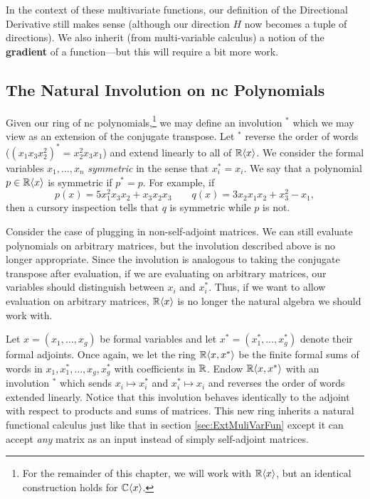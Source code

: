 In the context of these multivariate functions, our definition of the
Directional Derivative still makes sense (although our direction \(H\) now
becomes a tuple of directions). We also inherit (from multi-variable calculus) a
notion of the \textbf{gradient} of a function---but this will require a bit more work.

\subsection{The Natural Involution on nc Polynomials}%
\label{ssec:NatInvo}

Given our ring of nc polynomials,\footnote{For the remainder of this chapter,
  we will work with \(\mathbb{R} \langle x \rangle \), but an identical construction
  holds for \(\mathbb{C} \langle x \rangle \).}
we may define an involution \(^*\) which we
may view as an extension of the conjugate transpose. Let \(^*\) reverse the
order of words (\ie \((x_1x_3x_2^2)^* = x_2^2x_3x_1\)) and extend linearly to
all of \(\mathbb{R} \langle x \rangle \). We consider the formal
variables \(x_1, \dots , x_n\) \emph{symmetric} in the sense that
\(x_i^* = x_i\). We say that a polynomial \(p \in \mathbb{R} \langle x \rangle \) is
symmetric if \(p^* = p\). For example, if
\[
  p(x) = 5x_1^2x_3x_2 + x_3x_2x_3 \qquad q(x) = 3x_2x_1x_2 + x_3^2 - x_1 ,
\]
then a cursory inspection tells that \(q\) is symmetric while \(p\) is not.

Consider the case of plugging in non-self-adjoint matrices. We can
still evaluate polynomials on arbitrary matrices, but the involution described
above is no longer appropriate. Since the involution is analogous to taking the
conjugate transpose after evaluation, if we are evaluating on arbitrary
matrices, our variables should distinguish between \(x_i\) and \(x_i^*\). Thus,
if we want to allow evaluation on arbitrary matrices,
\(\mathbb{R} \langle x \rangle \) is no longer the natural algebra we should work with.

Let \(x = (x_1, \dots, x_g)\) be formal variables and let
\(x^* = (x_1^*, \dots, x_g^*)\) denote their formal adjoints. Once again, we let
the ring \(\mathbb{R} \langle x,x^* \rangle \) be the finite formal sums of words in
\(x_1,x_1^*, \dots , x_g,x_g^*\) with coefficients in \(\mathbb{R} \). Endow
\(\mathbb{R} \langle x,x^* \rangle \) with an involution \(^*\) which sends
\(x_i \mapsto x_i^*\) and \(x_i^* \mapsto x_i\) and reverses the order of words
extended linearly. Notice that this involution behaves identically to the
adjoint with respect to products and sums of matrices. This new ring inherits a
natural functional calculus just like that in section \ref{sec:ExtMuliVarFun}
except it can accept \emph{any} matrix as an input instead of simply
self-adjoint matrices.

